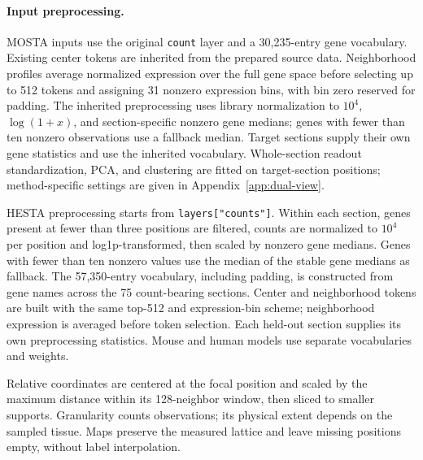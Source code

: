 \paragraph{Input preprocessing.}
MOSTA inputs use the original \texttt{count} layer and a 30,235-entry gene vocabulary. Existing center tokens are inherited from the prepared source data. Neighborhood profiles average normalized expression over the full gene space before selecting up to 512 tokens and assigning 31 nonzero expression bins, with bin zero reserved for padding. The inherited preprocessing uses library normalization to $10^4$, $\log(1+x)$, and section-specific nonzero gene medians; genes with fewer than ten nonzero observations use a fallback median. Target sections supply their own gene statistics and use the inherited vocabulary. Whole-section readout standardization, PCA, and clustering are fitted on target-section positions; method-specific settings are given in Appendix~\ref{app:dual-view}.

HESTA preprocessing starts from \texttt{layers["counts"]}. Within each section, genes present at fewer than three positions are filtered, counts are normalized to $10^4$ per position and log1p-transformed, then scaled by nonzero gene medians. Genes with fewer than ten nonzero values use the median of the stable gene medians as fallback. The 57,350-entry vocabulary, including padding, is constructed from gene names across the 75 count-bearing sections. Center and neighborhood tokens are built with the same top-512 and expression-bin scheme; neighborhood expression is averaged before token selection. Each held-out section supplies its own preprocessing statistics. Mouse and human models use separate vocabularies and weights.

Relative coordinates are centered at the focal position and scaled by the maximum distance within its 128-neighbor window, then sliced to smaller supports. Granularity counts observations; its physical extent depends on the sampled tissue. Maps preserve the measured lattice and leave missing positions empty, without label interpolation.

